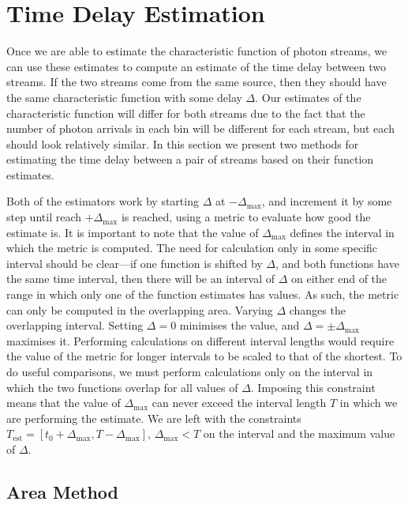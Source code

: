 \documentclass[a4paper,11pt]{article}
\begin{document}
\section{Time Delay Estimation}
\label{sec-5}

  Once we are able to estimate the characteristic function of photon streams, we
  can use these estimates to compute an estimate of the time delay between two
  streams. If the two streams come from the same source, then they should have the
  same characteristic function with some delay $\Delta$. Our estimates of the
  characteristic function will differ for both streams due to the fact that the
  number of photon arrivals in each bin will be different for each stream, but
  each should look relatively similar. In this section we present two methods for
  estimating the time delay between a pair of streams based on their function
  estimates.

  Both of the estimators work by starting $\Delta$ at $-\Delta_{\text{max}}$,
  and increment it by some step until reach $+\Delta_{\text{max}}$ is reached,
  using a metric to evaluate how good the estimate is. It is important to note
  that the value of $\Delta_{\text{max}}$ defines the interval in which the
  metric is computed. The need for calculation only in some specific interval
  should be clear---if one function is shifted by $\Delta$, and both functions
  have the same time interval, then there will be an interval of $\Delta$ on
  either end of the range in which only one of the function estimates has
  values. As such, the metric can only be computed in the overlapping
  area. Varying $\Delta$ changes the overlapping interval. Setting $\Delta=0$
  minimises the value, and $\Delta=\pm\Delta_{\text{max}}$ maximises it.
  Performing calculations on different interval lengths would require the value
  of the metric for longer intervals to be scaled to that of the shortest. To do
  useful comparisons, we must perform calculations only on the interval in which
  the two functions overlap for all values of $\Delta$. Imposing this constraint
  means that the value of $\Delta_{\text{max}}$ can never exceed the interval
  length $T$ in which we are performing the estimate. We are left with the
  constraints $T_{\text{est}}=[t_0+\Delta_{\text{max}},
  T-\Delta_{\text{max}}],\,\Delta_{\text{max}}<T$ on the interval and the
  maximum value of $\Delta$.
\subsection{Area Method}
\label{sec-5-1}
\end{document}
